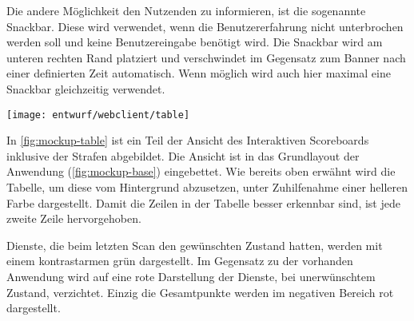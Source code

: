 Die andere Möglichkeit den Nutzenden zu informieren, ist die sogenannte Snackbar. Diese wird verwendet, wenn die Benutzererfahrung nicht unterbrochen werden soll und keine Benutzereingabe benötigt wird.
Die Snackbar wird am  unteren rechten Rand platziert und verschwindet im Gegensatz zum Banner nach einer definierten Zeit automatisch. Wenn möglich wird auch hier maximal eine Snackbar gleichzeitig verwendet.

\begin{center}
	\texttt{[image: entwurf/webclient/table]}
	\label{fig:mockup-table}
\end{center}

In \autoref{fig:mockup-table} ist ein Teil der Ansicht des Interaktiven Scoreboards inklusive der Strafen abgebildet. Die Ansicht ist in das Grundlayout der Anwendung (\autoref{fig:mockup-base}) eingebettet. Wie bereits oben erwähnt wird die Tabelle, um diese vom Hintergrund abzusetzen, unter Zuhilfenahme einer helleren Farbe dargestellt. Damit die Zeilen in der Tabelle besser erkennbar sind, ist jede zweite Zeile hervorgehoben. 

Dienste, die beim letzten Scan den gewünschten Zustand hatten, werden mit einem kontrastarmen grün dargestellt. Im Gegensatz zu der vorhanden Anwendung wird auf eine rote Darstellung der Dienste, bei unerwünschtem Zustand, verzichtet. Einzig die Gesamtpunkte werden im negativen Bereich rot dargestellt.
